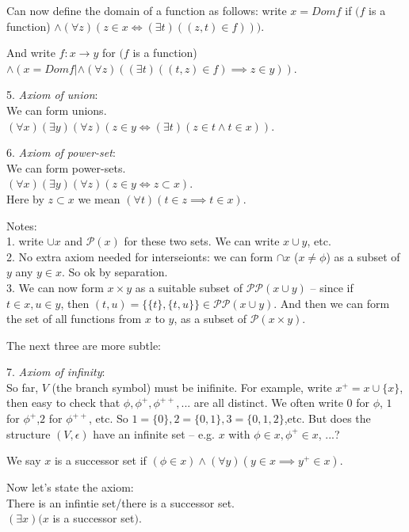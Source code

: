 \documentclass[a4paper]{article}
\begin{document}
Can now define the domain of a function as follows: write $x = Dom f$ if $(f$ is a function) $\wedge (\forall z)(z \in x \iff (\exists t)((z,t) \in f)))$.

And write $f:x \to y$ for $(f$ is a function) $\wedge (x=Dom f|\wedge (\forall z)((\exists t)((t,z) \in f) \implies z \in y))$.

5. \emph{Axiom of union}:\\
We can form unions.\\
$(\forall x)(\exists y)(\forall z)(z \in y \iff (\exists t) (z \in t \wedge t \in x))$.

6. \emph{Axiom of power-set}:\\
We can form power-sets.\\
$(\forall x)(\exists y) (\forall z) (z \in y \iff z \subset x)$.\\
Here by $z \subset x$ we mean $(\forall t)(t \in z \implies t \in x)$.

Notes:\\
1. write $\cup x$ and $\mathcal{P}(x)$ for these two sets. We can write $x \cup y$, etc.\\
2. No extra axiom needed for interseionts: we can form $\cap x$ ($x \neq \phi$) as a subset of $y$ any $y \in x$. So ok by separation.\\
3. We can now form $x \times y$ as a suitable subset of $\mathcal{P}\mathcal{P}(x\cup y)$ -- since if $t \in x,u \in y$, then $(t,u) = \{\{t\},\{t,u\}\}\in\mathcal{P}\mathcal{P}(x \cup y)$. And then we can form the set of all functions from $x$ to $y$, as a subset of $\mathcal{P}(x \times y)$.

The next three are more subtle:

7. \emph{Axiom of infinity}:\\
So far, $V$ (the branch symbol) must be inifinite. For example, write $x^+ = x \cup \{x\}$, then easy to check that $\phi,\phi^+,\phi^{++},...$ are all distinct. We often write $0$ for $\phi$, $1$ for $\phi^+$,$2$ for $\phi^{++}$, etc. So $1 = \{0\}, 2 = \{0,1\},3=\{0,1,2\}$,etc. But does the structure $(V,\epsilon)$ have an infinite set -- e.g. $x$ with $\phi \in x,\phi^+ \in x$, ...?

We say $x$ is a successor set if $(\phi \in x) \wedge (\forall y) (y \in x \implies y^+ \in x)$.

Now let's state the axiom:\\
There is an infintie set/there is a successor set.\\
$(\exists x) (x$ is a successor set$)$.
\end{document}
